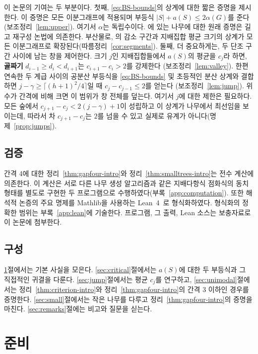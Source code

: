 \documentclass[11pt,a4paper]{article}
\theoremstyle{definition}
\begin{document}
이 논문의 기여는 두 부분이다. 첫째, \eqref{eq:BS-bounds}의 상계에 대한 짧은 증명을
제시한다. 이 증명은 모든 이분그래프에 적용되며 부등식
$|S|+a(S)\le 2\alpha(G)$를 준다(보조정리~\ref{lem:upper}). 여기서 $\alpha$는
독립수이다. \cite{BS}에 있는 나무에 대한 원래 증명은 길고 재구성 논법에 의존한다.
부산물로, \cite{BS}의 감소 구간과 지배집합 평균 크기의 상계가 모든 이분그래프로
확장된다(따름정리~\ref{cor:segments}). 둘째, 더 중요하게는, 두 단조 구간 사이에 남는
창을 제어한다. 크기 $j$인 지배집합들에서 $a(S)$의 평균을 $c_j$라 하면,
\textbf{골짜기} $d_{i-1}\ge d_i<d_{i+1}$는 $c_{i+1}-c_i>2$를 강제한다
(보조정리~\ref{lem:valley}). 한편 연속한 두 계급 사이의 공분산 부등식을
\eqref{eq:BS-bounds} 및 초등적인 분산 상계와 결합하면
$j-\gamma\ge\lceil (h+1)^2/4\rceil$일 때 $c_{j}-c_{j-1}\le 2$를 얻는다
(보조정리~\ref{lem:jump}). 위수가 간격에 비해 크면 이 범위가 창 전체를 덮는다. 여기서
$j$에 대한 제한은 필요하다. 모든 숲에서 $c_{j+1}-c_j<2(j-\gamma)+1$이 성립하고 이
상계가 나무에서 최선임을 보이는데, 따라서 차 $c_{j+1}-c_j$는 $2$를 넘을 수 있고 실제로
유계가 아니다(명제~\ref{prop:jumps}).

\subsection*{검증}
간격 4에 대한 정리~\ref{thm:gapfour-intro}와 정리~\ref{thm:smalltrees-intro}는 전수
계산에 의존한다. 이 계산은 서로 다른 나무 생성 알고리즘과 같은 지배다항식 점화식의 동치 형태를 별도로 구현한 두
프로그램으로 수행하였다(부록~\ref{app:computation}). 또한 해석적 논증의 주요 명제를
Mathlib을 사용하는 Lean~4~\cite{Lean,Mathlib}로 형식화하였다. 형식화의 정확한 범위는
부록~\ref{app:lean}에 기술한다. 프로그램, 그 출력, Lean 소스는 보충자료로 이 논문에
첨부한다.

\subsection*{구성}
\ref{sec:prelim}절에서는 기본 사실을 모은다. \ref{sec:critical}절에서는 $a(S)$에 대한
두 부등식과 그 직접적인 귀결을 다룬다. \ref{sec:jump}절에서는 평균 $c_j$를 연구하고,
\ref{sec:unimodal}절에서는 정리~\ref{thm:criterion-intro}와
정리~\ref{thm:gapfour-intro}의 간격 3 이하인 경우를 증명한다. \ref{sec:small}절에서는
작은 나무를 다루고 정리~\ref{thm:gapfour-intro}의 증명을 마친다.
\ref{sec:remarks}절에는 비고와 질문을 싣는다.

\section{준비}\label{sec:prelim}
\end{document}
